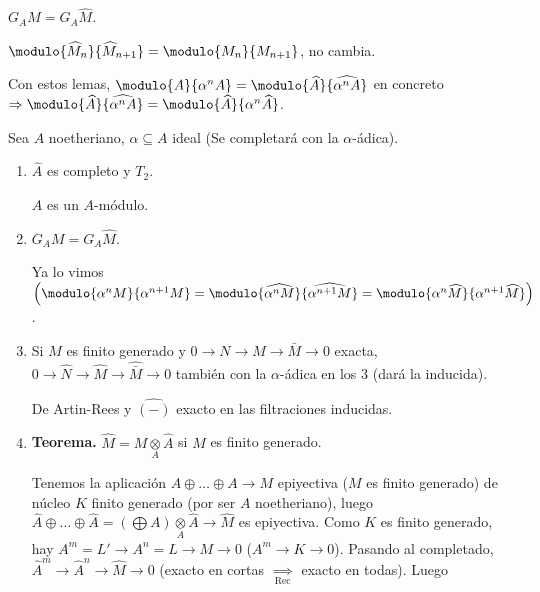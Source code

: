 \begin{cor}
    $G_A M = G_A \widehat{M}$.
\end{cor}
\begin{dem}
    $\modulo{\widehat{M}_n}{\widehat{M}_{n+1}} = \modulo{M_n}{M_{n+1}}$, no cambia.
\end{dem}
Con estos lemas, $\modulo{A}{\alpha^n A} = \modulo{\widehat{A}}{\widehat{\alpha^n A}}$ en concreto $\Rightarrow \modulo{\widehat{A}}{\widehat{\alpha^n A}} = \modulo{\widehat{A}}{\alpha^n \widehat{A}}$.
\begin{cor}[Propiedades] Sea $A$ noetheriano, $\alpha \subseteq A$ ideal (Se completará con la $\alpha$-ádica).
    \begin{enumerate}
        \item $\widehat{A}$ es completo y $T_2$.
        \begin{dem}
            $A$ es un $A$-módulo.
        \end{dem}        
        \item $G_A M = G_A \widehat{M}$.
        \begin{dem}
            Ya lo vimos \quad $\left( \modulo{\alpha^n M}{\alpha^{n+1} M} = \modulo{\widehat{\alpha^n M}}{\widehat{\alpha^{n+1} M}} = \modulo{\alpha^n \widehat{M}}{\alpha^{n+1} \widehat{M}} \right)$.
        \end{dem}        
        \item Si $M$ es finito generado y $0 \to N \to M \to \bar{M} \to 0$ exacta, \\
        $0 \to \widehat{N} \to \widehat{M} \to \widehat{\bar{M}} \to 0$ también con la $\alpha$-ádica en los 3 (dará la inducida).
        \begin{dem}
            De Artin-Rees y $\widehat{(-)}$ exacto en las filtraciones inducidas.
        \end{dem}        
        \item \textbf{Teorema.} $\widehat{M} = M \underset{A}{\otimes} \widehat{A}$ si $M$ es finito generado.
        \begin{dem}
            Tenemos la aplicaci\'on $A \oplus \dots \oplus A \to M$ epiyectiva ($M$ es finito generado) de núcleo $K$ finito generado (por ser $A$ noetheriano), luego $\widehat{A} \oplus \dots \oplus \widehat{A} = (\displaystyle \bigoplus A) \underset{A}{\otimes} \widehat{A} \to \widehat{M}$ es epiyectiva. Como $K$ es finito generado, hay $A^m = L' \longrightarrow A^n = L \longrightarrow M \to 0$ ($A^m \to K \to 0$). Pasando al completado, $\widehat{A}^m \to \widehat{A}^n \to \widehat{M} \to 0$ (exacto en cortas $\underset{\text{Rec}}{\implies}$ exacto en todas). Luego 

\end{dem}
\end{enumerate}
\end{cor}
